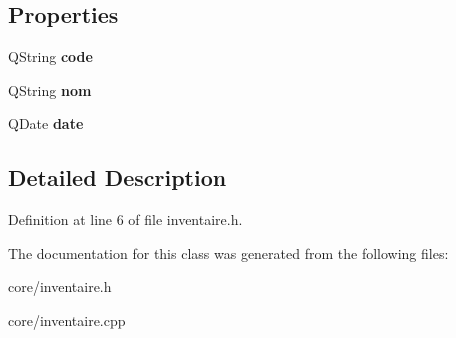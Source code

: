 \subsection*{Properties}
\begin{DoxyCompactItemize}
\item 
\hypertarget{class_inventaire_aeb3861e8a528858bd46af1fe298a5cd2}{
QString {\bfseries code}}
\label{df/d54/class_inventaire_aeb3861e8a528858bd46af1fe298a5cd2}

\item 
\hypertarget{class_inventaire_a566226c89f519a91b876631e53aa4e8c}{
QString {\bfseries nom}}
\label{df/d54/class_inventaire_a566226c89f519a91b876631e53aa4e8c}

\item 
\hypertarget{class_inventaire_a3c35c1ba27edb65e974e6aaad2678fdf}{
QDate {\bfseries date}}
\label{df/d54/class_inventaire_a3c35c1ba27edb65e974e6aaad2678fdf}

\end{DoxyCompactItemize}


\subsection{Detailed Description}


Definition at line 6 of file inventaire.h.



The documentation for this class was generated from the following files:\begin{DoxyCompactItemize}
\item 
core/inventaire.h\item 
core/inventaire.cpp\end{DoxyCompactItemize}
